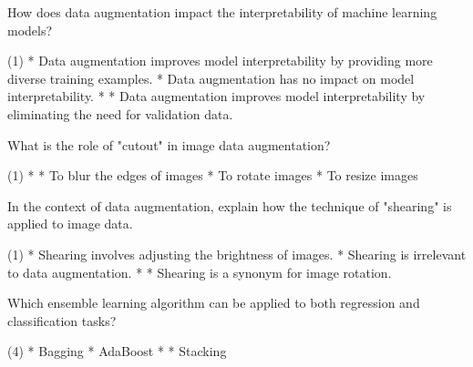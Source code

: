 \documentclass[11pt]{extarticle}
\begin{document}
\begin{exercise}
    How does data augmentation impact the interpretability of machine learning models?
    \begin{choice} (1)
        * Data augmentation improves model interpretability by providing more diverse training examples.
        * Data augmentation has no impact on model interpretability.
        * 
        * Data augmentation improves model interpretability by eliminating the need for validation data.
    \end{choice}
\end{exercise}
\begin{solution}
\end{solution}

\begin{exercise}
    What is the role of "cutout" in image data augmentation?
    \begin{choice} (1)
        * 
        * To blur the edges of images
        * To rotate images
        * To resize images
    \end{choice}
\end{exercise}
\begin{solution}
\end{solution}

\begin{exercise}
    In the context of data augmentation, explain how the technique of "shearing" is applied to image data.
    \begin{choice} (1)
        * Shearing involves adjusting the brightness of images.
        * Shearing is irrelevant to data augmentation.
        * 
        * Shearing is a synonym for image rotation.
    \end{choice}
\end{exercise}
\begin{solution}
\end{solution}

\begin{exercise}
    Which ensemble learning algorithm can be applied to both regression and classification tasks?
    \begin{choice} (4)
        * Bagging
        * AdaBoost
        * 
        * Stacking
    \end{choice}
\end{exercise}
\begin{solution}
\end{solution}
\end{document}
